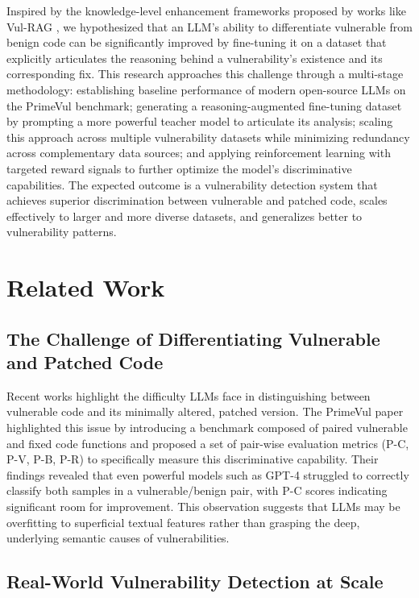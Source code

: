 \documentclass[12pt,a4paper]{article}
\begin{document}
Inspired by the knowledge-level enhancement frameworks proposed by works like Vul-RAG \cite{vul-rag}, we hypothesized that an LLM's ability to differentiate vulnerable from benign code can be significantly improved by fine-tuning it on a dataset that explicitly articulates the reasoning behind a vulnerability's existence and its corresponding fix. This research approaches this challenge through a multi-stage methodology: establishing baseline performance of modern open-source LLMs on the PrimeVul benchmark; generating a reasoning-augmented fine-tuning dataset by prompting a more powerful teacher model to articulate its analysis; scaling this approach across multiple vulnerability datasets while minimizing redundancy across complementary data sources; and applying reinforcement learning with targeted reward signals to further optimize the model's discriminative capabilities. The expected outcome is a vulnerability detection system that achieves superior discrimination between vulnerable and patched code, scales effectively to larger and more diverse datasets, and generalizes better to vulnerability patterns.

\section{Related Work}

\subsection{The Challenge of Differentiating Vulnerable and Patched Code}

Recent works highlight the difficulty LLMs face in distinguishing between vulnerable code and its minimally altered, patched version. The PrimeVul paper \cite{primevul} highlighted this issue by introducing a benchmark composed of paired vulnerable and fixed code functions and proposed a set of pair-wise evaluation metrics (P-C, P-V, P-B, P-R) to specifically measure this discriminative capability. Their findings revealed that even powerful models such as GPT-4 struggled to correctly classify both samples in a vulnerable/benign pair, with P-C scores indicating significant room for improvement. This observation suggests that LLMs may be overfitting to superficial textual features rather than grasping the deep, underlying semantic causes of vulnerabilities.

\subsection{Real-World Vulnerability Detection at Scale}
\end{document}
